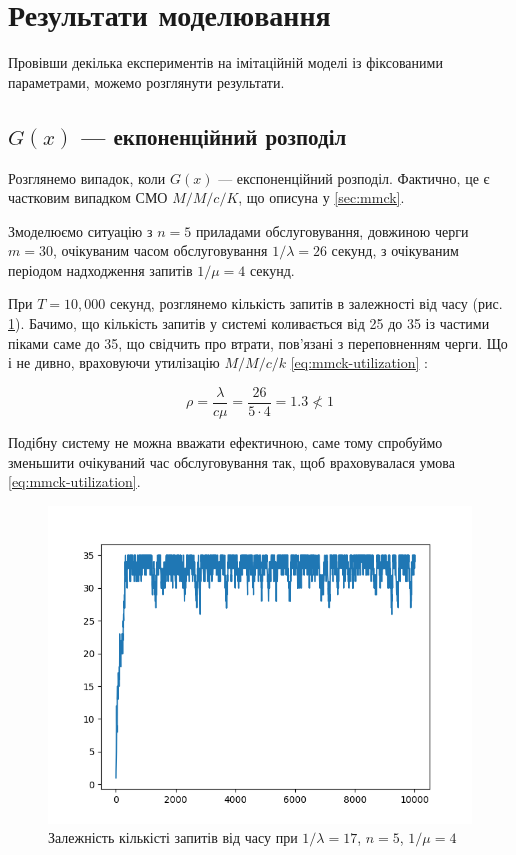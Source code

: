 \documentclass[14pt]{extarticle}
\begin{document}
\newpage

\section{Результати моделювання}

Провівши декілька експериментів на імітаційній моделі із фіксованими
параметрами, можемо розглянути результати.

\subsection{\(G(x)\)  --- екпоненційний розподіл}

Розглянемо випадок, коли \(G(x)\) --- експоненційний розподіл. Фактично, це є
частковим випадком СМО \(M/M/c/K\), що описуна у \ref{sec:mmck}.

Змоделюємо ситуацію з \(n = 5\) приладами обслуговування, довжиною черги
\(m = 30\), очікуваним часом обслуговування \(1 / \lambda = 26\) секунд, з очікуваним
періодом надходження запитів \(1 / \mu = 4\) секунд.

При \(T = 10,000\) секунд, розглянемо кількість запитів в залежності від часу
(рис. \ref{img:exp-fail-first-requests}). Бачимо, що кількість запитів у системі
коливається від 25 до 35 із частими піками саме до 35, що свідчить про втрати,
пов\textquoteright язані з переповненням черги. Що і не дивно, враховуючи
утилізацію \(M/M/c/k\) \eqref{eq:mmck-utilization} :

\begin{equation*}
  \rho = \frac{\lambda}{c \mu} = \frac{26}{5 \cdot 4} = 1.3 \nless 1
\end{equation*}

Подібну систему не можна вважати ефектичною, саме тому спробуймо зменьшити
очікуваний час обслуговування так, щоб враховувалася умова
\ref{eq:mmck-utilization}.

\begin{figure}
  \centering
  \includegraphics{fail-seconds-requests_in_system.png}\caption{{Залежність
      кількісті запитів від часу при \(1/\lambda = 17\), \(n = 5\),
      \(1/\mu = 4\)}}\label{img:exp-fail-first-requests}
\end{figure}
\end{document}
